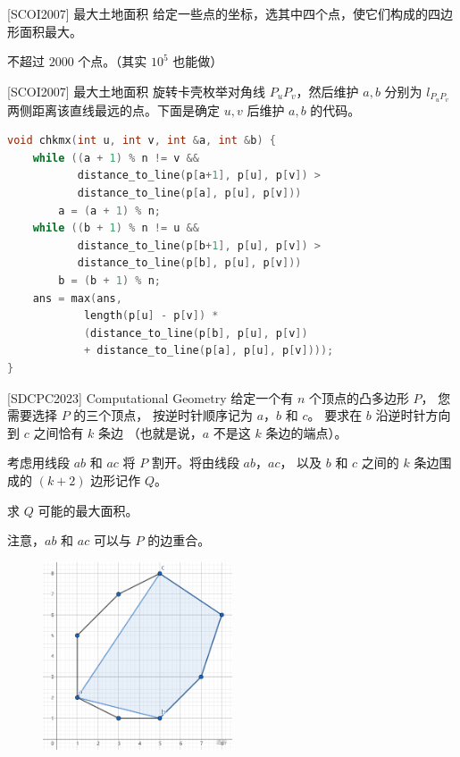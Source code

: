 \documentclass{beamer}
\begin{document}
\begin{frame}{[SCOI2007] 最大土地面积}
    \small
    给定一些点的坐标，选其中四个点，使它们构成的四边形面积最大。
    
    \vspace{1em}
    不超过 $2000$ 个点。（其实 $10^5$ 也能做）
\end{frame}

\begin{frame}[fragile]{[SCOI2007] 最大土地面积}
    \small
    旋转卡壳枚举对角线 $P_uP_v$，然后维护 $a,b$ 分别为
    $l_{P_uP_v}$ 两侧距离该直线最远的点。下面是确定 $u,v$ 后维护 $a,b$ 的代码。

    \begin{lstlisting}[language=c++]
void chkmx(int u, int v, int &a, int &b) {
    while ((a + 1) % n != v && 
           distance_to_line(p[a+1], p[u], p[v]) > 
           distance_to_line(p[a], p[u], p[v]))
        a = (a + 1) % n;
    while ((b + 1) % n != u && 
           distance_to_line(p[b+1], p[u], p[v]) > 
           distance_to_line(p[b], p[u], p[v]))
        b = (b + 1) % n;
    ans = max(ans,
            length(p[u] - p[v]) * 
            (distance_to_line(p[b], p[u], p[v]) 
            + distance_to_line(p[a], p[u], p[v])));
}
    \end{lstlisting}
\end{frame}

\begin{frame}{ [SDCPC2023] Computational Geometry}
    \footnotesize
    给定一个有 $n$ 个顶点的凸多边形 $P$，
    您需要选择 $P$ 的三个顶点，
    按逆时针顺序记为 $a$，$b$ 和 $c$。
    要求在 $b$ 沿逆时针方向到 $c$ 之间恰有 $k$ 条边
    （也就是说，$a$ 不是这 $k$ 条边的端点）。

    考虑用线段 $ab$ 和 $ac$ 将 $P$ 割开。将由线段 $ab$，$ac$，
    以及 $b$ 和 $c$ 之间的 $k$ 条边围成的 $(k + 2)$ 边形记作 $Q$。
    
    求 $Q$ 可能的最大面积。
    
    注意，$ab$ 和 $ac$ 可以与 $P$ 的边重合。

    \begin{figure}[H]
        \centering
        \includegraphics[width=0.5\textwidth]{pic/sdcpc2023sample.png}
    \end{figure}
\end{frame}
\end{document}
